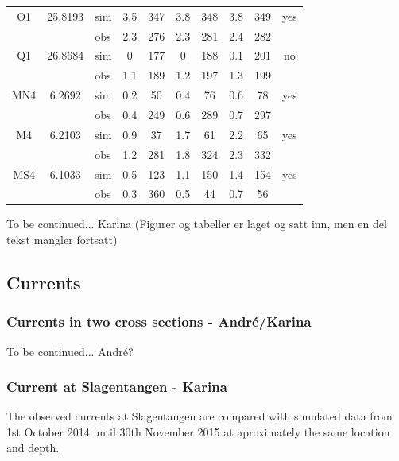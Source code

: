 \documentclass[12pt,a4paper,english]{article}
\begin{document}
\begin{table}[ht]
\begin{tabular}{|c|c|l|cc|cc|cc|c|}
\small O1   & 25.8193 & sim & 3.5 & 347 & 3.8 & 348 & 3.8 & 349 & yes  \\
\small      &        & obs & 2.3 & 276 & 2.3 & 281 & 2.4 & 282 &    \\
\small Q1   & 26.8684 & sim & 0 & 177 & 0 & 188 & 0.1 & 201 & no   \\
\small      &        & obs & 1.1 & 189 & 1.2 & 197 & 1.3 & 199 &    \\
\small MN4  & 6.2692 & sim & 0.2 & 50 & 0.4 & 76 & 0.6 & 78 & yes  \\
\small      &        & obs & 0.4 & 249 & 0.6 & 289 & 0.7 & 297 &    \\
\small M4   & 6.2103 & sim & 0.9 & 37 & 1.7 & 61 & 2.2 & 65 & yes  \\
\small      &        & obs & 1.2 & 281 & 1.8 & 324 & 2.3 & 332 &    \\
\small MS4  & 6.1033 & sim & 0.5 & 123 & 1.1 & 150 & 1.4 & 154 & yes  \\
\small      &        & obs & 0.3 & 360 & 0.5 & 44 & 0.7 & 56 &    \\
\hline
\end{tabular}
\end{table}


 
To be continued... Karina (Figurer og tabeller er laget og satt inn, men en del tekst mangler fortsatt)


\clearpage 
\subsection{Currents}

\subsubsection{Currents in two cross sections - Andr\'{e}/Karina}
To be continued... Andr\'{e}?

\subsubsection{Current at Slagentangen - Karina}
The observed currents at Slagentangen are compared with simulated data from 1st October 2014 until 30th November 2015 at aproximately the same location and depth.

\end{document}
